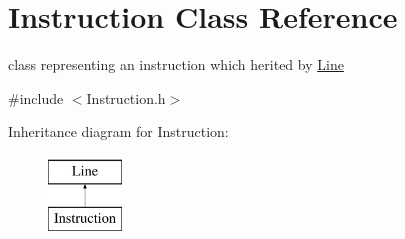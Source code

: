 \hypertarget{classInstruction}{\section{\-Instruction \-Class \-Reference}
\label{classInstruction}
}


class representing an instruction which herited by \hyperlink{classLine}{\-Line}  




{\ttfamily \#include $<$\-Instruction.\-h$>$}

\-Inheritance diagram for \-Instruction\-:\begin{figure}[H]
\begin{center}
\leavevmode
\includegraphics[height=2.000000cm]{classInstruction}
\end{center}
\end{figure}
